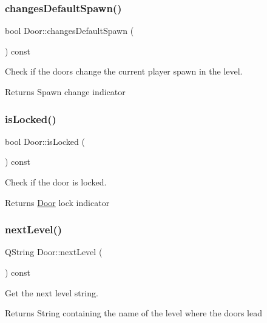 \subsubsection{\texorpdfstring{changes\+Default\+Spawn()}{changesDefaultSpawn()}}
{\footnotesize\ttfamily bool Door\+::changes\+Default\+Spawn (\begin{DoxyParamCaption}{ }\end{DoxyParamCaption}) const}



Check if the doors change the current player spawn in the level. 

\begin{DoxyReturn}{Returns}
Spawn change indicator 
\end{DoxyReturn}
\mbox{\label{class_door_ab72060b0c9bbfa00dcc2f02952927dba}} 
\subsubsection{\texorpdfstring{is\+Locked()}{isLocked()}}
{\footnotesize\ttfamily bool Door\+::is\+Locked (\begin{DoxyParamCaption}{ }\end{DoxyParamCaption}) const}



Check if the door is locked. 

\begin{DoxyReturn}{Returns}
\hyperlink{class_door}{Door} lock indicator 
\end{DoxyReturn}
\mbox{\label{class_door_a2ed65424b864f28dc980205c38ebd1d9}} 
\subsubsection{\texorpdfstring{next\+Level()}{nextLevel()}}
{\footnotesize\ttfamily Q\+String Door\+::next\+Level (\begin{DoxyParamCaption}{ }\end{DoxyParamCaption}) const}



Get the next level string. 

\begin{DoxyReturn}{Returns}
String containing the name of the level where the doors lead 
\end{DoxyReturn}
\mbox{\label{class_door_a95fe6168b86f58e1a29a4ce40079afb0}} 
